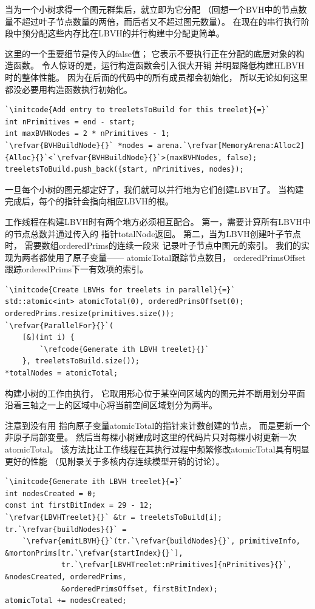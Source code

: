 当为一个小树求得一个图元群集后，就立即为它分配
（回想一个BVH中的节点数量不超过叶子节点数量的两倍，而后者又不超过图元数量）。
在现在的串行执行阶段中预分配这些内存比在LBVH的并行构建中分配更简单。

这里的一个重要细节是传入的{\ttfamily false}值；
它表示不要执行正在分配的底层对象的构造函数。
令人惊讶的是，运行构造函数会引入很大开销
并明显降低构建HLBVH时的整体性能。
因为在后面的代码中的所有成员都会初始化，
所以无论如何这里都没必要用构造函数执行初始化。

\begin{lstlisting}
`\initcode{Add entry to treeletsToBuild for this treelet}{=}`
int nPrimitives = end - start;
int maxBVHNodes = 2 * nPrimitives - 1;
`\refvar{BVHBuildNode}{}` *nodes = arena.`\refvar[MemoryArena:Alloc2]{Alloc}{}`<`\refvar{BVHBuildNode}{}`>(maxBVHNodes, false);
treeletsToBuild.push_back({start, nPrimitives, nodes});
\end{lstlisting}

一旦每个小树的图元都定好了，我们就可以并行地为它们创建LBVH了。
当构建完成后，每个的指针会指向相应LBVH的根。

工作线程在构建LBVH时有两个地方必须相互配合。
第一，需要计算所有LBVH中的节点总数并通过传入的
指针{\ttfamily totalNode}返回。
第二，当为LBVH创建叶子节点时，
需要数组{\ttfamily orderedPrims}的连续一段来
记录叶子节点中图元的索引。
我们的实现为两者都使用了原子变量——
{\ttfamily atomicTotal}跟踪节点数目，
{\ttfamily orderedPrimsOffset}跟踪{\ttfamily orderedPrims}下一有效项的索引。
\begin{lstlisting}
`\initcode{Create LBVHs for treelets in parallel}{=}`
std::atomic<int> atomicTotal(0), orderedPrimsOffset(0);
orderedPrims.resize(primitives.size());
`\refvar{ParallelFor}{}`(
    [&](int i) {
        `\refcode{Generate ith LBVH treelet}{}`
    }, treeletsToBuild.size());
*totalNodes = atomicTotal;
\end{lstlisting}

构建小树的工作由执行，
它取用形心位于某空间区域内的图元并不断用划分平面
沿着三轴之一上的区域中心将当前空间区域划分为两半。

注意到没有用
指向原子变量{\ttfamily atomicTotal}的指针来计数创建的节点，
而是更新一个非原子局部变量。
然后当每棵小树建成时这里的代码片只对每棵小树更新一次{\ttfamily atomicTotal}。
该方法比让工作线程在其执行过程中频繁修改{\ttfamily atomicTotal}具有明显更好的性能
（见附录关于多核内存连续模型开销的讨论）。
\begin{lstlisting}
`\initcode{Generate ith LBVH treelet}{=}`
int nodesCreated = 0;
const int firstBitIndex = 29 - 12;
`\refvar{LBVHTreelet}{}` &tr = treeletsToBuild[i];
tr.`\refvar{buildNodes}{}` = 
    `\refvar{emitLBVH}{}`(tr.`\refvar{buildNodes}{}`, primitiveInfo, &mortonPrims[tr.`\refvar{startIndex}{}`],
             tr.`\refvar[LBVHTreelet:nPrimitives]{nPrimitives}{}`, &nodesCreated, orderedPrims,
             &orderedPrimsOffset, firstBitIndex);
atomicTotal += nodesCreated;
\end{lstlisting}


